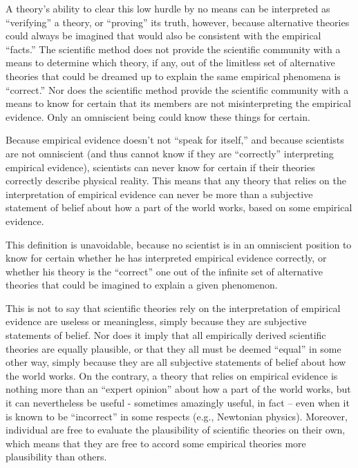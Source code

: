 A theory’s ability to clear this low hurdle by no means can be interpreted as ``verifying'' a theory, or ``proving'' its truth, however, because alternative theories could always be imagined that would also be consistent with the empirical ``facts.''  The scientific method does not provide the scientific community with a means to determine which theory, if any, out of the limitless set of alternative theories that could be dreamed up to explain the same empirical phenomena is ``correct.''  Nor does the scientific method provide the scientific community with a means to know for certain that its members are not misinterpreting the empirical evidence. Only an omniscient being could know these things for certain.

Because empirical evidence doesn’t not ``speak for itself,'' and because scientists are not omniscient (and thus cannot know if they are ``correctly'' interpreting empirical evidence), scientists can never know for certain if their theories correctly describe physical reality. This means that any theory that relies on the interpretation of empirical evidence can never be more than a subjective statement of belief about how a part of the world works, based on some empirical evidence.

This definition is unavoidable, because no scientist is in an omniscient position to know for certain whether he has interpreted empirical evidence correctly, or whether his theory is the ``correct'' one out of the infinite set of alternative theories that could be imagined to explain a given phenomenon.

This is not to say that scientific theories rely on the interpretation of empirical evidence are useless or meaningless, simply because they are subjective statements of belief. Nor does it imply that all empirically derived scientific theories are equally plausible, or that they all must be deemed “equal” in some other way, simply because they are all subjective statements of belief about how the world works. On the contrary, a theory that relies on empirical evidence is nothing more than an ``expert opinion'' about how a part of the world works, but it can nevertheless be useful - sometimes amazingly useful, in fact – even when it is known to be ``incorrect'' in some respects (e.g., Newtonian physics). Moreover, individual are free to evaluate the plausibility of scientific theories on their own, which means that they are free to accord some empirical theories more plausibility than others.

